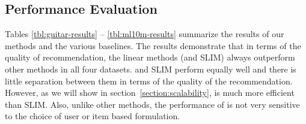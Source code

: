 \documentclass{article}
\begin{document}
\hspace{-5em}
\subsection{Performance Evaluation}

Tables \ref{tbl:guitar-results} -- \ref{tbl:ml10m-results} summarize the results of our methods and the various baselines.
The results demonstrate that in terms of the quality of recommendation, the linear methods (\LinearLow and SLIM) always outperform other methods
in all four datasets. \LinearLow and SLIM perform equally well and there is little separation between them in terms of the quality of
the recommendation. However, as we will show in section~\ref{section:scalability}, \LinearLow is much more efficient than SLIM.
Also, unlike other methods, the performance of \LinearLow is not very sensitive to the choice of user or item based formulation.
\end{document}
